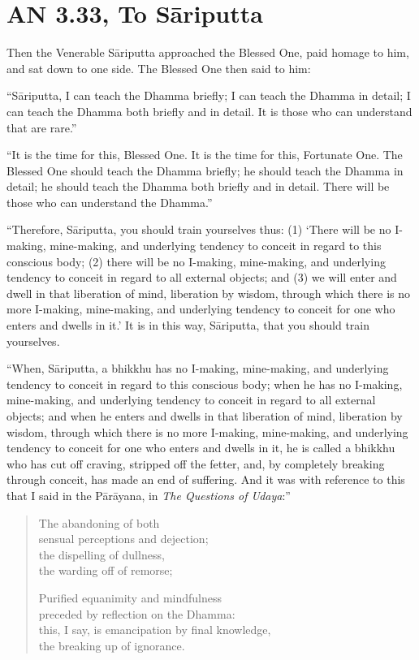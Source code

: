 \chapter{AN 3.33, To Sāriputta}

Then the Venerable Sāriputta approached the Blessed One, paid homage to him, and sat down to one side. The Blessed One then said to him:

``Sāriputta, I can teach the Dhamma briefly; I can teach the Dhamma in detail; I can teach the Dhamma both briefly and in detail. It is those who can understand that are rare.''

``It is the time for this, Blessed One. It is the time for this, Fortunate One. The Blessed One should teach the Dhamma briefly; he should teach the Dhamma in detail; he should teach the Dhamma both briefly and in detail. There will be those who can understand the Dhamma.''

``Therefore, Sāriputta, you should train yourselves thus: (1) `There will be no I-making, mine-making, and underlying tendency to conceit in regard to this conscious body; (2) there will be no I-making, mine-making, and underlying tendency to conceit in regard to all external objects; and (3) we will enter and dwell in that liberation of mind, liberation by wisdom, through which there is no more I-making, mine-making, and underlying tendency to conceit for one who enters and dwells in it.' It is in this way, Sāriputta, that you should train yourselves.

``When, Sāriputta, a bhikkhu has no I-making, mine-making, and underlying tendency to conceit in regard to this conscious body; when he has no I-making, mine-making, and underlying tendency to conceit in regard to all external objects; and when he enters and dwells in that liberation of mind, liberation by wisdom, through which there is no more I-making, mine-making, and underlying tendency to conceit for one who enters and dwells in it, he is called a bhikkhu who has cut off craving, stripped off the fetter, and, by completely breaking through conceit, has made an end of suffering. And it was with reference to this that I said in the Pārāyana, in \emph{The Questions of Udaya}:''

\begin{quote}
The abandoning of both\\
sensual perceptions and dejection;\\
the dispelling of dullness,\\
the warding off of remorse;

Purified equanimity and mindfulness\\
preceded by reflection on the Dhamma:\\
this, I say, is emancipation by final knowledge,\\
the breaking up of ignorance.
\end{quote}

